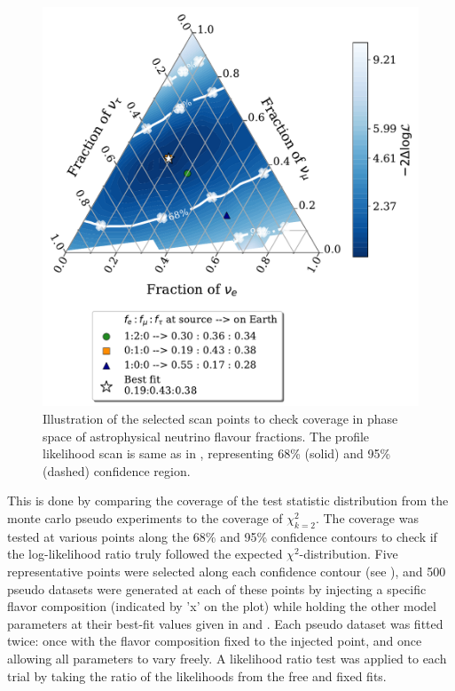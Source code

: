 \begin{figure}[h!]
    
    \includegraphics{./figures/results/HESE12_fancy_coverage.pdf}


    \caption{Illustration of the selected scan points to check coverage in phase space of astrophysical neutrino flavour fractions. The profile likelihood scan is same as in , representing 68\% (solid) and 95\% (dashed) confidence region.}
\end{figure}

This is done by comparing the coverage of the test statistic distribution from the monte carlo pseudo experiments to the coverage of $\chi_{k=2}^2$. The coverage was tested at various points along the 68\% and 95\% confidence contours to check if the log-likelihood ratio truly followed the expected \(\chi^2\)-distribution. Five representative points were selected along each confidence contour (see ), and 500 pseudo datasets were generated at each of these points by injecting a specific flavor composition (indicated by 'x' on the plot) while holding the other model parameters at their best-fit values given in  and . Each pseudo dataset was fitted twice: once with the flavor composition fixed to the injected point, and once allowing all parameters to vary freely. A likelihood ratio test was applied to each trial by taking the ratio of the likelihoods from the free and fixed fits.

